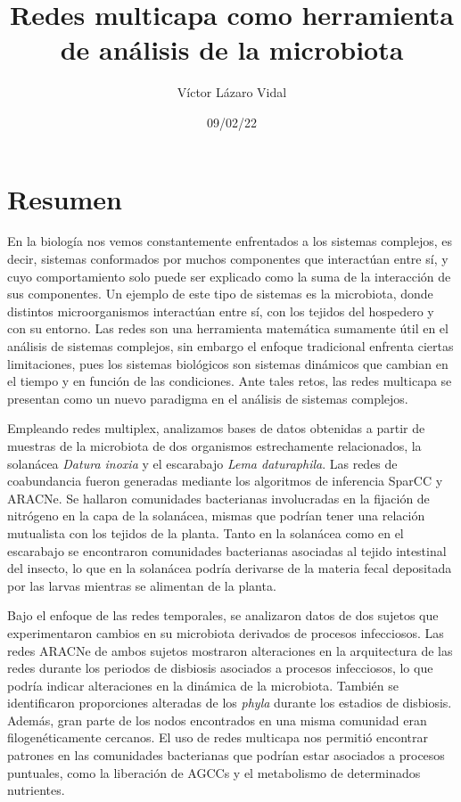 \documentclass[
]{book}
\title{Redes multicapa como herramienta de análisis de la microbiota}
\author{Víctor Lázaro Vidal}
\date{09/02/22}
\begin{document}
\maketitle

{
\setcounter{tocdepth}{1}
\tableofcontents
}
\hypertarget{resumen}{%
\chapter*{Resumen}\label{resumen}}

En la biología nos vemos constantemente enfrentados a los sistemas complejos, es decir, sistemas conformados por muchos componentes que interactúan entre sí, y cuyo comportamiento solo puede ser explicado como la suma de la interacción de sus componentes. Un ejemplo de este tipo de sistemas es la microbiota, donde distintos microorganismos interactúan entre sí, con los tejidos del hospedero y con su entorno. Las redes son una herramienta matemática sumamente útil en el análisis de sistemas complejos, sin embargo el enfoque tradicional enfrenta ciertas limitaciones, pues los sistemas biológicos son sistemas dinámicos que cambian en el tiempo y en función de las condiciones. Ante tales retos, las redes multicapa se presentan como un nuevo paradigma en el análisis de sistemas complejos.

Empleando redes multiplex, analizamos bases de datos obtenidas a partir de muestras de la microbiota de dos organismos estrechamente relacionados, la solanácea \emph{Datura inoxia} y el escarabajo \emph{Lema daturaphila}. Las redes de coabundancia fueron generadas mediante los algoritmos de inferencia SparCC y ARACNe. Se hallaron comunidades bacterianas involucradas en la fijación de nitrógeno en la capa de la solanácea, mismas que podrían tener una relación mutualista con los tejidos de la planta. Tanto en la solanácea como en el escarabajo se encontraron comunidades bacterianas asociadas al tejido intestinal del insecto, lo que en la solanácea podría derivarse de la materia fecal depositada por las larvas mientras se alimentan de la planta.

Bajo el enfoque de las redes temporales, se analizaron datos de dos sujetos que experimentaron cambios en su microbiota derivados de procesos infecciosos. Las redes ARACNe de ambos sujetos mostraron alteraciones en la arquitectura de las redes durante los periodos de disbiosis asociados a procesos infecciosos, lo que podría indicar alteraciones en la dinámica de la microbiota. También se identificaron proporciones alteradas de los \emph{phyla} durante los estadios de disbiosis. Además, gran parte de los nodos encontrados en una misma comunidad eran filogenéticamente cercanos. El uso de redes multicapa nos permitió encontrar patrones en las comunidades bacterianas que podrían estar asociados a procesos puntuales, como la liberación de AGCCs y el metabolismo de determinados nutrientes.
\end{document}

